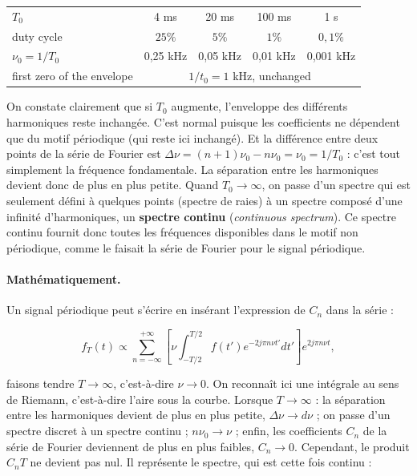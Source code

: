 \begin{center}
  \small
  \begin{tabular}{lcccc}
    \toprule
    $T_0$ & 4 ms & 20 ms & 100 ms & 1 s \\
    duty cycle & $25\%$ & $5\%$ & $1\%$ & $0{,}1\%$ \\
    $\nu_0=1/T_0$ & 0,25 kHz & 0,05 kHz & 0,01 kHz & 0,001 kHz \\
    first zero of the envelope & \multicolumn{4}{c}{$1/t_0=1$ kHz, unchanged}\\
    \bottomrule
  \end{tabular}
\end{center}

On constate clairement que si $T_0$ augmente, l'enveloppe des différents
harmoniques reste inchangée. C'est normal puisque les coefficients ne dépendent
que du motif périodique (qui reste ici inchangé). Et la différence entre deux
points de la série de Fourier est $\Delta\nu=(n+1)\nu_0-n\nu_0=\nu_0=1/T_0$ :
c'est tout simplement la fréquence fondamentale. La séparation entre les
harmoniques devient donc de plus en plus petite. Quand $T_0\to\infty$, on passe
d'un spectre qui est seulement défini à quelques points (spectre de raies) à un
spectre composé d'une infinité d'harmoniques, un \textbf{spectre continu}
(\textit{continuous spectrum}). Ce spectre continu fournit donc toutes les
fréquences disponibles dans le motif non périodique, comme le faisait la série
de Fourier pour le signal périodique.

\paragraph{Mathématiquement.} Un signal périodique peut s'écrire en insérant
l'expression de $C_n$ dans la série :

\[
  f_T(t)\propto\sum_{n=-\infty}^{+\infty}
    \left[\nu\int_{-T/2}^{T/2}f(t')e^{-2j\pi n\nu t'}dt'\right]e^{2j\pi n\nu t},
\]

faisons tendre $T\to\infty$, c'est-à-dire $\nu\to 0$. On reconnaît ici une
intégrale au sens de Riemann, c'est-à-dire l'aire sous la courbe. Lorsque
$T\to\infty$ : la séparation entre les harmoniques devient de plus en plus
petite, $\Delta\nu\to d\nu$ ; on passe d'un spectre discret à un spectre
continu ; $n\nu_0\to\nu$ ; enfin, les coefficients $C_n$ de la série de Fourier
deviennent de plus en plus faibles, $C_n\to 0$. Cependant, le produit $C_nT$ ne
devient pas nul. Il représente le spectre, qui est cette fois continu :

